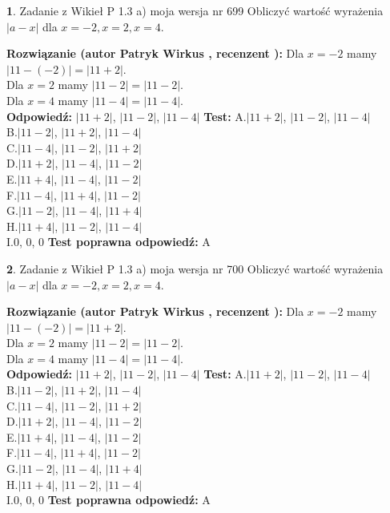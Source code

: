 \documentclass[12pt, a4paper]{article}
\theoremstyle{definition} %
\newtheorem{zad}{}
\newcommand{\zadStart}[1]{\begin{zad}#1\newline}
\newcommand{\zadStop}{\end{zad}}
\newcommand{\rozwStart}[2]{\noindent \textbf{Rozwiązanie (autor #1 , recenzent #2): }\newline}
\newcommand{\rozwStop}{\newline}
\newcommand{\odpStart}{\noindent \textbf{Odpowiedź:}\newline}
\newcommand{\odpStop}{\newline}
\newcommand{\testStart}{\noindent \textbf{Test:}\newline}
\newcommand{\testStop}{\newline}
\newcommand{\kluczStart}{\noindent \textbf{Test poprawna odpowiedź:}\newline}
\newcommand{\kluczStop}{\newline}
\begin{document}
\zadStart{Zadanie z Wikieł P 1.3 a) moja wersja nr 699}
Obliczyć wartość wyrażenia $|a - x|$ dla $x=-2,x=2,x=4$.
\zadStop
\rozwStart{Patryk Wirkus}{}
Dla $x = -2$ mamy $|11 - (-2)| = |11 + 2|$.\\
Dla $x = 2$ mamy $|11 - 2| = |11 - 2|$.\\
Dla $x = 4$ mamy $|11 - 4| = |11 - 4|$.\\
\rozwStop
\odpStart
$|11 + 2|$, $|11 - 2|$, $|11 - 4|$
\odpStop
\testStart
A.$|11 + 2|$, $|11 - 2|$, $|11 - 4|$\\
B.$|11 - 2|$, $|11 + 2|$, $|11 - 4|$\\
C.$|11 - 4|$, $|11 - 2|$, $|11 + 2|$\\
D.$|11 + 2|$, $|11 - 4|$, $|11 - 2|$\\
E.$|11 + 4|$, $|11 - 4|$, $|11 - 2|$\\
F.$|11 - 4|$, $|11 + 4|$, $|11 - 2|$\\
G.$|11 - 2|$, $|11 - 4|$, $|11 + 4|$\\
H.$|11 + 4|$, $|11 - 2|$, $|11 - 4|$\\
I.$0$, $0$, $0$
\testStop
\kluczStart
A
\kluczStop



\zadStart{Zadanie z Wikieł P 1.3 a) moja wersja nr 700}
Obliczyć wartość wyrażenia $|a - x|$ dla $x=-2,x=2,x=4$.
\zadStop
\rozwStart{Patryk Wirkus}{}
Dla $x = -2$ mamy $|11 - (-2)| = |11 + 2|$.\\
Dla $x = 2$ mamy $|11 - 2| = |11 - 2|$.\\
Dla $x = 4$ mamy $|11 - 4| = |11 - 4|$.\\
\rozwStop
\odpStart
$|11 + 2|$, $|11 - 2|$, $|11 - 4|$
\odpStop
\testStart
A.$|11 + 2|$, $|11 - 2|$, $|11 - 4|$\\
B.$|11 - 2|$, $|11 + 2|$, $|11 - 4|$\\
C.$|11 - 4|$, $|11 - 2|$, $|11 + 2|$\\
D.$|11 + 2|$, $|11 - 4|$, $|11 - 2|$\\
E.$|11 + 4|$, $|11 - 4|$, $|11 - 2|$\\
F.$|11 - 4|$, $|11 + 4|$, $|11 - 2|$\\
G.$|11 - 2|$, $|11 - 4|$, $|11 + 4|$\\
H.$|11 + 4|$, $|11 - 2|$, $|11 - 4|$\\
I.$0$, $0$, $0$
\testStop
\kluczStart
A
\kluczStop
\end{document}
